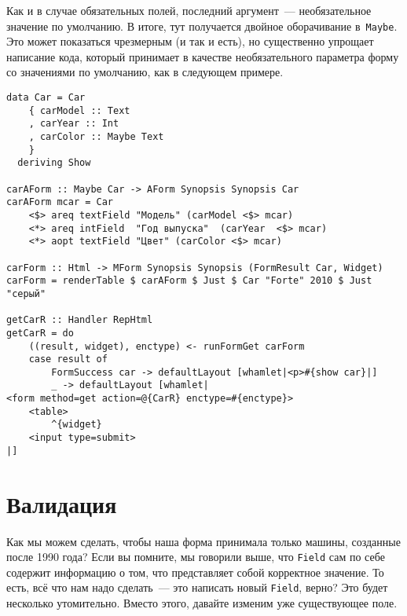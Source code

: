 Как и в случае обязательных полей, последний аргумент~--- необязательное
значение по умолчанию.  В итоге, тут получается двойное оборачивание
в~\lstinline'Maybe'. Это может показаться чрезмерным (и так и есть), но
существенно упрощает написание кода, который принимает в качестве
необязательного параметра форму со значениями по умолчанию, как в следующем
примере.

\begin{lstlisting}[caption={Необязательные поля со значениями по умолчанию}]
data Car = Car
    { carModel :: Text
    , carYear :: Int
    , carColor :: Maybe Text
    }
  deriving Show

carAForm :: Maybe Car -> AForm Synopsis Synopsis Car
carAForm mcar = Car
    <$> areq textField "Модель" (carModel <$> mcar)
    <*> areq intField  "Год выпуска"  (carYear  <$> mcar)
    <*> aopt textField "Цвет" (carColor <$> mcar)

carForm :: Html -> MForm Synopsis Synopsis (FormResult Car, Widget)
carForm = renderTable $ carAForm $ Just $ Car "Forte" 2010 $ Just "серый"

getCarR :: Handler RepHtml
getCarR = do
    ((result, widget), enctype) <- runFormGet carForm
    case result of
        FormSuccess car -> defaultLayout [whamlet|<p>#{show car}|]
        _ -> defaultLayout [whamlet|
<form method=get action=@{CarR} enctype=#{enctype}>
    <table>
        ^{widget}
    <input type=submit>
|]
\end{lstlisting}

\section{Валидация}
Как мы можем сделать, чтобы наша форма принимала только машины, созданные
после 1990 года?  Если вы помните, мы говорили выше, что \lstinline'Field' сам
по себе содержит информацию о том, что представляет собой корректное значение. То
есть, всё что нам надо сделать~--- это написать новый \lstinline'Field',
верно? Это будет несколько утомительно. Вместо этого, давайте изменим уже
существующее поле.

